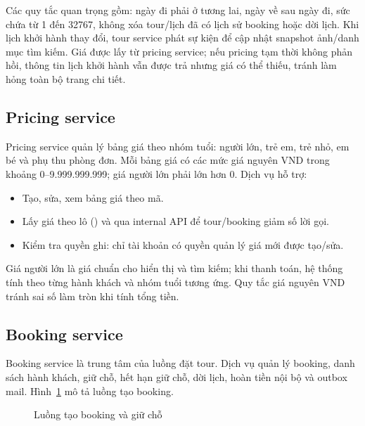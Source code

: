 Các quy tắc quan trọng gồm: ngày đi phải ở tương lai, ngày về sau ngày đi, sức chứa từ 1 đến 32767, không xóa tour/lịch đã có lịch sử booking hoặc dời lịch. Khi lịch khởi hành thay đổi, tour service phát sự kiện để cập nhật snapshot ảnh/danh mục tìm kiếm. Giá được lấy từ pricing service; nếu pricing tạm thời không phản hồi, thông tin lịch khởi hành vẫn được trả nhưng giá có thể thiếu, tránh làm hỏng toàn bộ trang chi tiết.

\subsection{Pricing service}
\label{subsec:pricing-service}

Pricing service quản lý bảng giá theo nhóm tuổi: người lớn, trẻ em, trẻ nhỏ, em bé và phụ thu phòng đơn. Mỗi bảng giá có các mức giá nguyên VND trong khoảng 0--9.999.999.999; giá người lớn phải lớn hơn 0. Dịch vụ hỗ trợ:

\begin{itemize}
  \item Tạo, sửa, xem bảng giá theo mã.
  \item Lấy giá theo lô () và qua internal API  để tour/\hspace{0pt}booking giảm số lời gọi.
  \item Kiểm tra quyền ghi: chỉ tài khoản có quyền quản lý giá mới được tạo/sửa.
\end{itemize}

Giá người lớn là giá chuẩn cho hiển thị và tìm kiếm; khi thanh toán, hệ thống tính theo từng hành khách và nhóm tuổi tương ứng. Quy tắc giá nguyên VND tránh sai số làm tròn khi tính tổng tiền.

\subsection{Booking service}
\label{subsec:booking-service}

Booking service là trung tâm của luồng đặt tour. Dịch vụ quản lý booking, danh sách hành khách, giữ chỗ, hết hạn giữ chỗ, dời lịch, hoàn tiền nội bộ và outbox mail. Hình~\ref{fig:sequence-booking} mô tả luồng tạo booking.

\begin{figure}[H]
\centering
\resizebox{\textwidth}{!}{}
\caption{Luồng tạo booking và giữ chỗ}
\label{fig:sequence-booking}
\end{figure}

